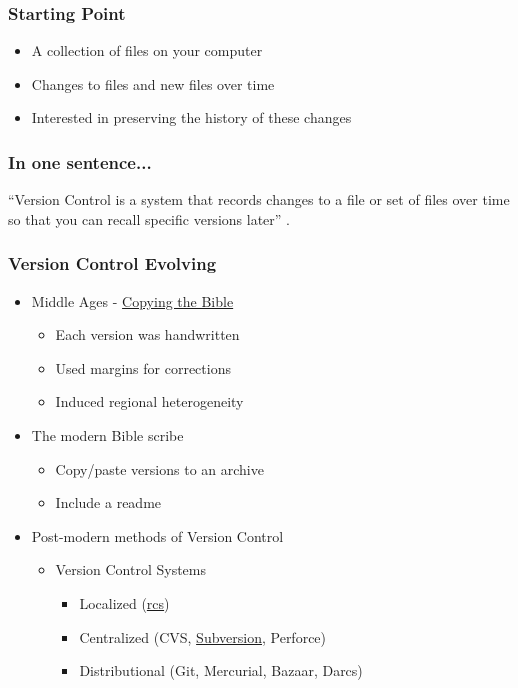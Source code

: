 
\begin{frame}
    \frametitle{Starting Point}

    \begin{itemize}
        \item A collection of files on your computer
        \item Changes to files and new files over time
        \item Interested in preserving the history 
        of these changes
    \end{itemize}
\end{frame}

\begin{frame}
    \frametitle{In one sentence...}
    ``Version Control is a system that records changes to a file or set of files
    over time so that you can recall specific versions later'' \citep{ChaconHamano2009}.
\end{frame}

\begin{frame}
    \frametitle{Version Control Evolving}
    \begin{itemize}
        \item Middle Ages - \href{http://en.wikipedia.org/wiki/Bible_translations}{Copying the Bible}
        \begin{itemize}
            \item Each version was handwritten
            \item Used margins for corrections
            \item Induced regional heterogeneity
        \end{itemize}
        \item The modern Bible scribe
        \begin{itemize}
            \item Copy/paste versions to an archive
            \item Include a readme
        \end{itemize}
        \item Post-modern methods of Version Control
        \begin{itemize}
            \item Version Control Systems
            \begin{itemize}
                \item Localized (\href{http://en.wikipedia.org/wiki/Revision_Control_System}{rcs})
                \item Centralized (CVS, \href{http://en.wikipedia.org/wiki/Apache_Subversion}{Subversion}, Perforce)
                \item Distributional (Git, Mercurial, Bazaar, Darcs)
            \end{itemize}
        \end{itemize}
    \end{itemize}
\end{frame}

